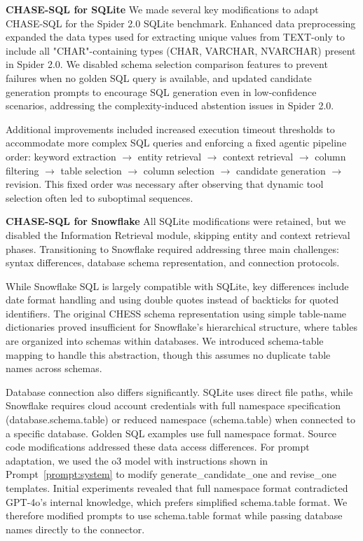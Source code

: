 \documentclass{article} %
\begin{document}
\noindent\textbf{CHASE-SQL for SQLite} We made several key modifications to adapt CHASE-SQL for the Spider 2.0 SQLite benchmark. {Enhanced data preprocessing} expanded the data types used for extracting unique values from TEXT-only to include all "CHAR"-containing types (CHAR, VARCHAR, NVARCHAR) present in Spider 2.0. We {disabled schema selection comparison} features to prevent failures when no golden SQL query is available, and {updated candidate generation prompts} to encourage SQL generation even in low-confidence scenarios, addressing the complexity-induced abstention issues in Spider 2.0.

Additional improvements included {increased execution timeout thresholds} to accommodate more complex SQL queries and {enforcing a fixed agentic pipeline order}: keyword extraction $\rightarrow$ entity retrieval $\rightarrow$ context retrieval $\rightarrow$ column filtering $\rightarrow$ table selection $\rightarrow$ column selection $\rightarrow$ candidate generation $\rightarrow$ revision. This fixed order was necessary after observing that dynamic tool selection often led to suboptimal sequences.

\noindent\textbf{CHASE-SQL for Snowflake}
All SQLite modifications were retained, but we disabled the Information Retrieval module, skipping entity and context retrieval phases. Transitioning to Snowflake required addressing three main challenges: syntax differences, database schema representation, and connection protocols.

While Snowflake SQL is largely compatible with SQLite, key differences include date format handling and using double quotes instead of backticks for quoted identifiers. The original CHESS schema representation using simple table-name dictionaries proved insufficient for Snowflake's hierarchical structure, where tables are organized into schemas within databases. We introduced schema-table mapping to handle this abstraction, though this assumes no duplicate table names across schemas.

Database connection also differs significantly. SQLite uses direct file paths, while Snowflake requires cloud account credentials with full namespace specification (database.schema.table) or reduced namespace (schema.table) when connected to a specific database. Golden SQL examples use full namespace format. Source code modifications addressed these data access differences. For prompt adaptation, we used the o3 model with instructions shown in Prompt~\ref{prompt:system} to modify generate\_candidate\_one and revise\_one templates. Initial experiments revealed that full namespace format contradicted GPT-4o's internal knowledge, which prefers simplified schema.table format. We therefore modified prompts to use schema.table format while passing database names directly to the connector.
\end{document}
